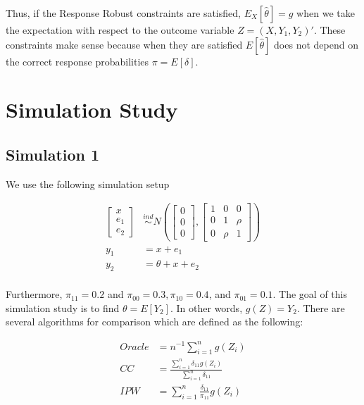 \documentclass[
  letterpaper,
  DIV=11,
  numbers=noendperiod]{scrartcl}
\begin{document}
Thus, if the Response Robust constraints are satisfied,
\(E_X[\hat \theta] = g\) when we take the expectation with respect to
the outcome variable \(Z = (X, Y_1, Y_2)'\). These constraints make
sense because when they are satisfied \(E[\hat \theta]\) does not depend
on the correct response probabilities \(\pi = E[\delta]\).

\hypertarget{sec-simulations}{%
\section{Simulation Study}\label{sec-simulations}}

\hypertarget{simulation-1}{%
\subsection*{Simulation 1}\label{simulation-1}}

We use the following simulation setup

\begin{align*}
  \begin{bmatrix} x \\ e_1 \\ e_2 \end{bmatrix} 
  &\stackrel{ind}{\sim} N\left(\begin{bmatrix} 0 \\ 0 \\ 0 \end{bmatrix}, 
  \begin{bmatrix} 1 & 0 & 0 \\ 0 & 1 & \rho \\ 0 & \rho & 1 \end{bmatrix}\right) \\
  y_1 &= x + e_1 \\
  y_2 &= \theta + x + e_2 \\
\end{align*}

Furthermore, \(\pi_{11} = 0.2\) and \(\pi_{00} = 0.3, \pi_{10} = 0.4\),
and \(\pi_{01} = 0.1\). The goal of this simulation study is to find
\(\theta = E[Y_2]\). In other words, \(g(Z) = Y_2\). There are several
algorithms for comparison which are defined as the following:

\begin{align*}
  Oracle &= n^{-1} \sum_{i = 1}^n g(Z_i)\\
  CC &= \frac{\sum_{i = 1}^n \delta_{11} g(Z_i)}{\sum_{i = 1}^n \delta_{11}} \\
  IPW &= \sum_{i = 1}^n \frac{\delta_{11}}{\pi_{11}} g(Z_i)\\
\end{align*}
\end{document}

